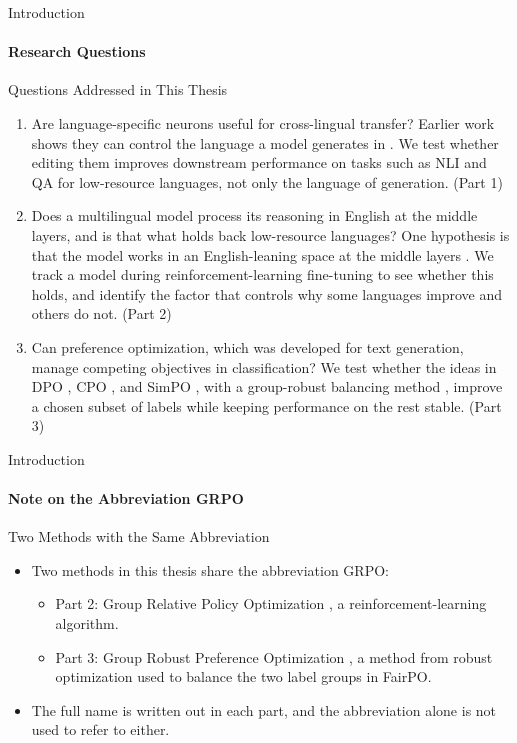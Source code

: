 \documentclass[aspectratio=169]{beamer}
\begin{document}
\begin{frame}{Introduction}
	\framesubtitle{Research Questions}
	\begin{block}{\scriptsize Questions Addressed in This Thesis}\scriptsize
		\begin{enumerate}
			\item Are language-specific neurons useful for cross-lingual transfer?
			Earlier work shows they can control the language a model generates in \autocite{tang2024language}. We test whether editing them improves downstream performance on tasks such as NLI and QA for low-resource languages, not only the language of generation. \hfill (Part 1)
			\item Does a multilingual model process its reasoning in English at the middle layers, and is that what holds back low-resource languages?
			One hypothesis is that the model works in an English-leaning space at the middle layers \autocite{wendler2024llamas}. We track a model during reinforcement-learning fine-tuning to see whether this holds, and identify the factor that controls why some languages improve and others do not. \hfill (Part 2)
			\item Can preference optimization, which was developed for text generation, manage competing objectives in classification?
			We test whether the ideas in DPO \autocite{rafailov2023direct}, CPO \autocite{xu2024contrastive}, and SimPO \autocite{meng2024simpo}, with a group-robust balancing method \autocite{ramesh2024group}, improve a chosen subset of labels while keeping performance on the rest stable. \hfill (Part 3)
		\end{enumerate}
	\end{block}
\end{frame}
	
	\begin{frame}{Introduction}
		\framesubtitle{Note on the Abbreviation GRPO}
		\begin{block}{\scriptsize Two Methods with the Same Abbreviation}\scriptsize
			\begin{itemize}
				\item Two methods in this thesis share the abbreviation GRPO:
				\begin{itemize}\scriptsize
					\item Part 2: Group Relative Policy Optimization \autocite{shao2024deepseekmath}, a reinforcement-learning algorithm.
					\item Part 3: Group Robust Preference Optimization \autocite{ramesh2024group}, a method from robust optimization used to balance the two label groups in FairPO.
				\end{itemize}
				\item The full name is written out in each part, and the abbreviation alone is not used to refer to either.
			\end{itemize}
		\end{block}
	\end{frame}
	
\end{document}
